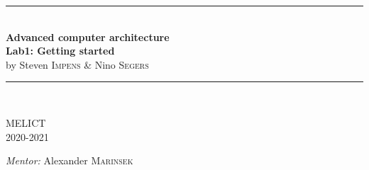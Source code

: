 \begin{titlepage}
\begin{center}

\rule{\linewidth}{1.5pt}\\[0.4cm]
{ \LARGE \bfseries Advanced computer architecture}\\[0.4cm]
{ \LARGE \bfseries Lab1: Getting started}\\[0.4cm]
{by Steven \textsc{Impens} \& Nino \textsc{Segers}}\\[0.2cm]
\rule{\linewidth}{1.5pt}\\[1.5cm]

\vfill

\begin{minipage}{0.49\textwidth}
\begin{flushleft} \large
MELICT\\
2020-2021\\
\end{flushleft}
\end{minipage}
\begin{minipage}{0.49\textwidth}
\begin{flushright} \large
\emph{Mentor:}
Alexander \textsc{Marinsek}\\
\end{flushright}
\end{minipage}

\end{center}
\end{titlepage}
